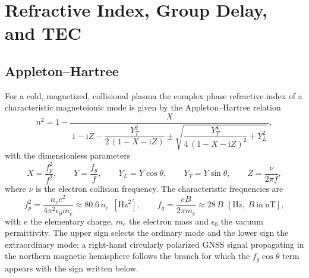 \section{Refractive Index, Group Delay, and TEC}
\label{sec:iono-refractive}

\subsection{Appleton--Hartree}
\label{sec:iono-appleton}

For a cold, magnetized, collisional plasma the complex phase refractive index of
a characteristic magnetoionic mode is given by the Appleton--Hartree relation
\citep{budden1985}
%
\begin{equation}
  \label{eq:iono-ah}
  n^2 = 1 -
  \frac{X}{\,1 - \mathrm{i}Z - \dfrac{Y_T^2}{2\,(1 - X - \mathrm{i}Z)}
        \pm \sqrt{\dfrac{Y_T^4}{4\,(1 - X - \mathrm{i}Z)^2} + Y_L^2}\,} ,
\end{equation}
%
with the dimensionless parameters
%
\begin{equation}
  \label{eq:iono-xyz}
  X = \frac{f_p^2}{f^2}, \qquad
  Y = \frac{f_g}{f}, \qquad
  Y_L = Y\cos\theta, \qquad
  Y_T = Y\sin\theta, \qquad
  Z = \frac{\nu}{2\pi f} ,
\end{equation}
%
where $\nu$ is the electron collision frequency.  The characteristic frequencies
are
%
\begin{equation}
  \label{eq:iono-fp}
  f_p^2 = \frac{n_e e^2}{4\pi^2 \epsilon_0 m_e} \approx 80.6\, n_e
  \ \ [\si{\square\hertz}] ,
  \qquad
  f_g = \frac{e B}{2\pi m_e} \approx 28\,B
  \ \ [\si{\hertz},\ B\ \text{in}\ \si{\nano\tesla}] ,
\end{equation}
%
with $e$ the elementary charge, $m_e$ the electron mass and $\epsilon_0$ the
vacuum permittivity.  The upper sign selects the ordinary mode and the lower
sign the extraordinary mode; a right-hand circularly polarized GNSS signal
propagating in the northern magnetic hemisphere follows the branch for which the
$f_g\cos\theta$ term appears with the sign written below.

